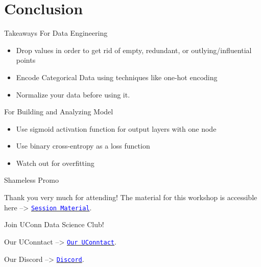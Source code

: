 \documentclass{beamer}
\begin{document}
\section{Conclusion}

\begin{frame}{Takeaways}
For Data Engineering
\begin{itemize}
	\item Drop values in order to get rid of empty, redundant, or outlying/influential points
	\item Encode Categorical Data using techniques like one-hot encoding
	\item Normalize your data before using it.
\end{itemize}
For Building and Analyzing Model
\begin{itemize}
	\item Use sigmoid activation function for output layers with one node
	\item Use binary cross-entropy as a loss function
	\item Watch out for overfitting
\end{itemize}
\end{frame}

\begin{frame}{Shameless Promo}

Thank you very much for attending! The material for this workshop is accessible here --> \href{https://github.com/PranavTavildar1/Tensorflow-For-Sports-Analytics}{\tt \textcolor{blue}{Session Material}}.
\par
Join UConn Data Science Club! 
\par
Our UConntact --> \href{https://uconntact.uconn.edu/organization/datascience}{\tt \textcolor{blue}{Our UConntact}}.
\par
Our Discord --> \href{https://discord.gg/UJCZjXUWzg}{\tt \textcolor{blue}{Discord}}.

\end{frame}
\end{document}
